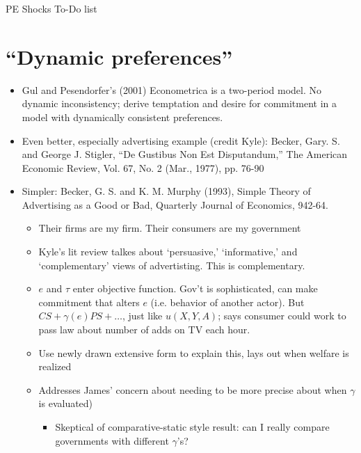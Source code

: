 \documentclass[12pt]{article}
\newcommand{\ga}{\gamma}
\begin{document}
\begin{center}
PE Shocks To-Do list
\end{center}

\section{``Dynamic preferences''}
	\begin{itemize}
					\item Gul and Pesendorfer's (2001) Econometrica is a two-period model. No dynamic inconsistency; derive temptation and desire for commitment in a model with dynamically consistent preferences.
					\item Even better, especially advertising example (credit Kyle): Becker, Gary. S. and George J. Stigler, ``De Gustibus Non Est Disputandum,'' The American Economic Review, Vol. 67, No. 2 (Mar., 1977), pp. 76-90
					\item Simpler: Becker, G. S. and K. M. Murphy (1993), Simple Theory of Advertising as a Good or Bad, Quarterly Journal of Economics, 942-64.
						\begin{itemize}
							\item Their firms are my firm. Their consumers are my government
							\item Kyle's lit review talkes about `persuasive,' `informative,' and `complementary' views of advertisting. This is complementary.
							\item $e$ and $\tau$ enter objective function. Gov't is sophisticated, can make commitment that alters $e$ (i.e. behavior of another actor). But $CS + \ga(e)PS + \ldots$, just like $u(X,Y,A)$; says consumer could work to pass law about number of adds on TV each hour.
							\item Use newly drawn extensive form to explain this, lays out when welfare is realized
							\item Addresses James' concern about needing to be more precise about when $\ga$ is evaluated)
			\begin{itemize}
				\item Skeptical of comparative-static style result: can I really compare governments with different $\ga$'s?
			\end{itemize}


\end{itemize}
\end{itemize}
\end{document}
